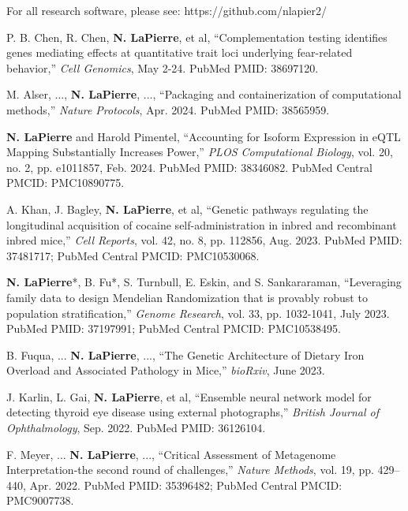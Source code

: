 \documentclass[margin, 10pt]{res} %
\begin{document}
\begin{resume}
 



For all research software, please see: https://github.com/nlapier2/

P. B. Chen, R. Chen, \textbf{N. LaPierre}, et al, ``Complementation testing identifies genes mediating effects at quantitative trait loci underlying fear-related behavior,'' \emph{Cell Genomics}, May 2-24. PubMed PMID: 38697120.

M. Alser, ..., \textbf{N. LaPierre}, ..., ``Packaging and containerization of computational methods,'' \emph{Nature Protocols}, Apr. 2024. PubMed PMID: 38565959.

\textbf{N. LaPierre} and Harold Pimentel, ``Accounting for Isoform Expression in eQTL Mapping Substantially Increases Power,'' \emph{PLOS Computational Biology}, vol. 20, no. 2, pp. e1011857, Feb. 2024. PubMed PMID: 38346082. PubMed Central PMCID: PMC10890775.

A. Khan, J. Bagley, \textbf{N. LaPierre}, et al, ``Genetic pathways regulating the longitudinal acquisition of cocaine self-administration in inbred and recombinant inbred mice,'' \emph{Cell Reports}, vol. 42, no. 8, pp. 112856, Aug. 2023.  PubMed PMID: 37481717; PubMed Central PMCID: PMC10530068.  

\textbf{N. LaPierre}*, B. Fu*, S. Turnbull, E. Eskin, and S. Sankararaman, ``Leveraging family data to design Mendelian Randomization that is provably robust to population stratification,'' \emph{Genome Research}, vol. 33, pp. 1032-1041, July 2023.  PubMed PMID: 37197991; PubMed Central PMCID: PMC10538495.

B. Fuqua, ... \textbf{N. LaPierre}, ..., ``The Genetic Architecture of Dietary Iron Overload and Associated Pathology in Mice,'' \emph{bioRxiv}, June 2023.

J. Karlin, L. Gai, \textbf{N. LaPierre}, et al, ``Ensemble neural network model for detecting thyroid eye disease using external photographs,'' \emph{British Journal of Ophthalmology}, Sep. 2022.  PubMed PMID: 36126104.

F. Meyer, ... \textbf{N. LaPierre}, ..., ``Critical Assessment of Metagenome Interpretation-the second round of challenges,'' \emph{Nature Methods}, vol. 19, pp. 429–440, Apr. 2022.  PubMed PMID: 35396482; PubMed Central PMCID: PMC9007738.


\end{resume}
\end{document}
